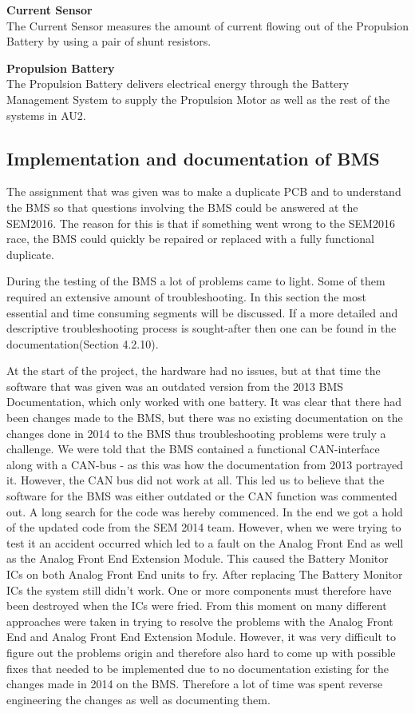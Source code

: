 \textbf{Current Sensor}\\
The Current Sensor measures the amount of current flowing out of the Propulsion Battery by using a pair of shunt resistors. 

\textbf{Propulsion Battery}\\
The Propulsion Battery delivers electrical energy through the Battery Management System to supply the Propulsion Motor as well as the rest of the systems in AU2.

\subsection{Implementation and documentation of BMS}
The assignment that was given was to make a duplicate PCB and to understand the BMS so that questions involving the BMS could be answered at the SEM2016. The reason for this is that if something went wrong to the SEM2016 race, the BMS could quickly be repaired or replaced with a fully functional duplicate.

During the testing of the BMS a lot of problems came to light. Some of them required an extensive amount of troubleshooting. In this section the most essential and time consuming segments will be discussed. If a more detailed and descriptive troubleshooting process is sought-after then one can be found in the documentation\cite{AU2}(Section 4.2.10).

At the start of the project, the hardware had no issues, but at that time the software that was given was an outdated version from the 2013 BMS Documentation\cite{BMSDocumentation}, which only worked with one battery. It was clear that there had been changes made to the BMS, but there was no existing documentation on the changes done in 2014 to the BMS thus troubleshooting problems were truly a challenge.
We were told that the BMS contained a functional CAN-interface along with a CAN-bus - as this was how the documentation from 2013 portrayed it. However, the CAN bus did not work at all. This led us to believe that the software for the BMS was either outdated or the CAN function was commented out. A long search for the code was hereby commenced. In the end we got a hold of the updated code from the SEM 2014 team. However, when we were trying to test it an accident occurred which led to a fault on the Analog Front End as well as the Analog Front End Extension Module. This caused the Battery Monitor ICs on both Analog Front End units to fry.
After replacing The Battery Monitor ICs the system still didn't work. One or more components must therefore have been destroyed when the ICs were fried. From this moment on many different approaches were taken in trying to resolve the problems with the Analog Front End and Analog Front End Extension Module. However, it was very difficult to figure out the problems origin and therefore also hard to come up with possible fixes that needed to be implemented due to no documentation existing for the changes made in 2014 on the BMS. Therefore a lot of time was spent reverse engineering the changes as well as documenting them. 

